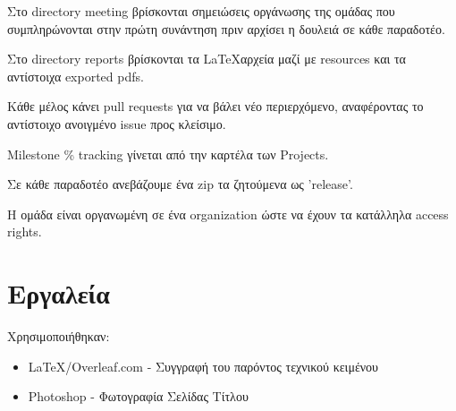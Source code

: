 \documentclass{article}
\begin{document}
Στο directory meeting βρίσκονται σημειώσεις οργάνωσης της ομάδας που συμπληρώνονται στην πρώτη συνάντηση πριν αρχίσει η δουλειά σε κάθε παραδοτέο.


Στο directory reports βρίσκονται τα \LaTeX αρχεία μαζί με resources και τα αντίστοιχα exported pdfs.


Κάθε μέλος κάνει pull requests για να βάλει νέο περιερχόμενο, αναφέροντας το αντίστοιχο ανοιγμένο issue προς κλείσιμο.


Milestone \% tracking γίνεται από την καρτέλα των Projects.


Σε κάθε παραδοτέο ανεβάζουμε ένα zip τα ζητούμενα ως 'release'.


Η ομάδα είναι οργανωμένη σε ένα organization ώστε να έχουν τα κατάλληλα access rights.

\section{Εργαλεία}
Χρησιμοποιήθηκαν:
\begin{itemize}
    \item \LaTeX/Overleaf.com - Συγγραφή του παρόντος τεχνικού κειμένου
    \item Photoshop - Φωτογραφία Σελίδας Τίτλου
\end{itemize}
\end{document}
